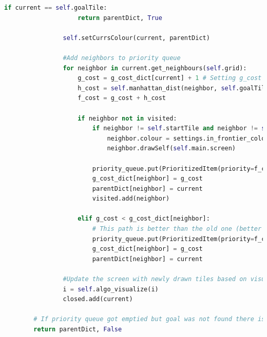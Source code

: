 \documentclass[12pt]{report}			%
\begin{document}
\begin{appendices}
\begin{lstlisting}[language = Python, caption={Algoritmus A*},captionpos=b]
                if current == self.goalTile:
                    return parentDict, True
                
                self.setCurrsColour(current, parentDict)

                #Add neighbors to priority queue
                for neighbor in current.get_neighbours(self.grid):
                    g_cost = g_cost_dict[current] + 1 # Setting g_cost to be always 0 would turn A* into Greedy best first search
                    h_cost = self.manhattan_dist(neighbor, self.goalTile) # Setting h_cost to be always 0 would turn A* into Uniform Cost Search
                    f_cost = g_cost + h_cost

                    if neighbor not in visited:
                        if neighbor != self.startTile and neighbor != self.goalTile:
                            neighbor.colour = settings.in_frontier_colour
                            neighbor.drawSelf(self.main.screen)
                            
                        priority_queue.put(PrioritizedItem(priority=f_cost, h_score=h_cost, item=neighbor))
                        g_cost_dict[neighbor] = g_cost
                        parentDict[neighbor] = current
                        visited.add(neighbor)

                    elif g_cost < g_cost_dict[neighbor]:
                        # This path is better than the old one (better g cost), update the priority queue; leaves old item with worse priorty in PQ, that gets resolved by closed list
                        priority_queue.put(PrioritizedItem(priority=f_cost, h_score=h_cost, item=neighbor)) 
                        g_cost_dict[neighbor] = g_cost
                        parentDict[neighbor] = current
                
                #Update the screen with newly drawn tiles based on visualization speed
                i = self.algo_visualize(i)
                closed.add(current)

        # If priority queue got emptied but goal was not found there is no path
        return parentDict, False
		\end{lstlisting}
	\end{appendices}
\end{document}
